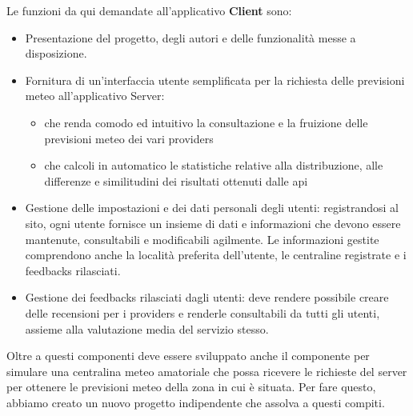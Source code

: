     \par Le funzioni da qui demandate all'applicativo \textbf{Client} sono:
    
    \begin{itemize}
    
        \item Presentazione del progetto, degli autori e delle funzionalità messe a disposizione.
        
        \item Fornitura di un'interfaccia utente semplificata per la richiesta delle previsioni meteo all'applicativo Server:
        
        \begin{itemize}
            \item che renda comodo ed intuitivo la consultazione e la fruizione delle previsioni meteo dei vari providers
            
            \item che calcoli in automatico le statistiche relative alla distribuzione, alle differenze e similitudini dei risultati ottenuti dalle api
        \end{itemize}
        
        \item Gestione delle impostazioni e dei dati personali degli utenti: registrandosi al sito, ogni utente fornisce un insieme di dati e informazioni che devono essere mantenute, consultabili e modificabili agilmente. Le informazioni gestite comprendono anche la località preferita dell'utente, le centraline registrate e i feedbacks rilasciati.
        
        \item Gestione dei feedbacks rilasciati dagli utenti: deve rendere possibile creare delle recensioni per i providers e renderle consultabili da tutti gli utenti, assieme alla valutazione media del servizio stesso.
    
    \end{itemize}
    
    \par Oltre a questi componenti deve essere sviluppato anche il componente per simulare una centralina meteo amatoriale che possa ricevere le richieste del server per ottenere le previsioni meteo della zona in cui è situata. Per fare questo, abbiamo creato un nuovo progetto indipendente che assolva a questi compiti.


